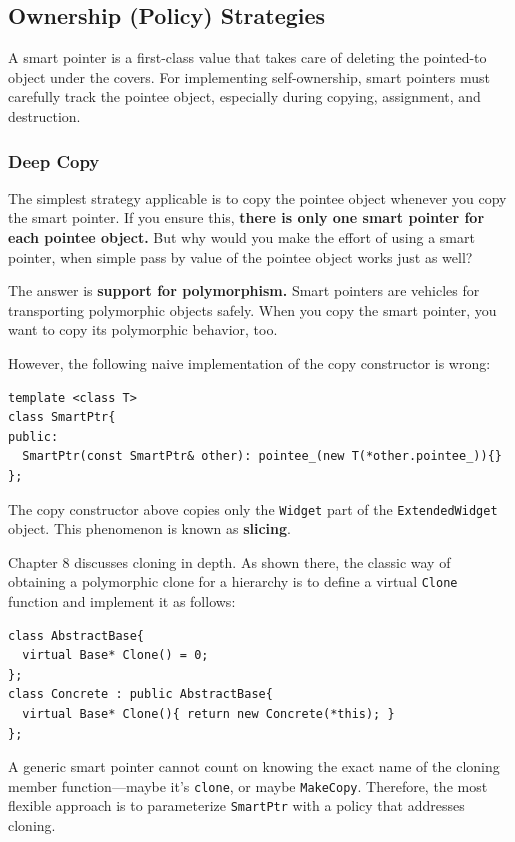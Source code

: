 \subsection{Ownership (Policy) Strategies}

A smart pointer is a first-class value that takes care of deleting the
pointed-to object under the covers.  For implementing self-ownership,
smart pointers must carefully track the pointee object, especially
during copying, assignment, and destruction.

\subsubsection{Deep Copy}
The simplest strategy applicable is to copy the pointee object
whenever you copy the smart pointer. If you ensure this, \textbf{there is only
  one smart pointer for each pointee object. } But why would you make
the effort of using a smart pointer, when simple pass by value of the
pointee object works just as well?

The answer is \textbf{support for polymorphism.} Smart pointers are
vehicles for transporting polymorphic objects safely. When you
copy the smart pointer, you want to copy its polymorphic behavior,
too.

However,  the following naive implementation of the
copy constructor is wrong:
\begin{verbatim}
template <class T>
class SmartPtr{
public:
  SmartPtr(const SmartPtr& other): pointee_(new T(*other.pointee_)){}
};
\end{verbatim}
The copy constructor above copies only the \texttt{Widget} part of
the \texttt{ExtendedWidget} object. This phenomenon is known as
\textbf{slicing}.

Chapter 8 discusses cloning in depth. As shown there, the classic way
of obtaining a polymorphic clone for a hierarchy is to define a
virtual \texttt{Clone} function and implement it as follows:
\begin{verbatim}
class AbstractBase{
  virtual Base* Clone() = 0;
};
class Concrete : public AbstractBase{
  virtual Base* Clone(){ return new Concrete(*this); }
};
\end{verbatim}

A generic smart pointer cannot count on knowing the exact name of the
cloning member function—maybe  it's \texttt{clone}, or maybe
\texttt{MakeCopy}. Therefore, the most flexible approach is to
parameterize \texttt{SmartPtr} with a policy that addresses cloning.

